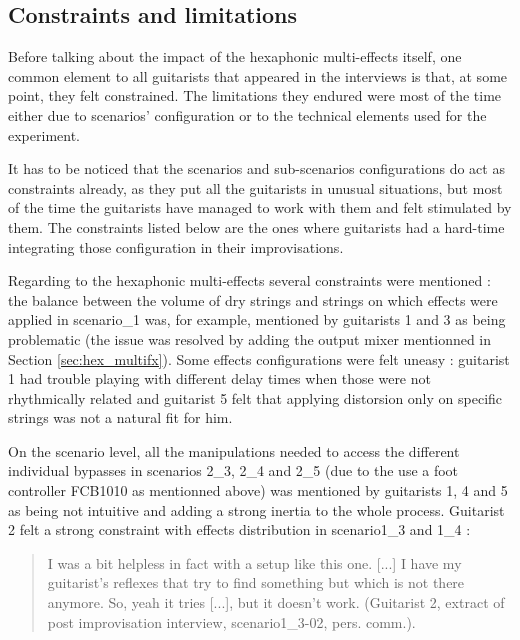 \documentclass{article}
\begin{document}

\subsection{Constraints and limitations}
Before talking about the impact of the hexaphonic multi-effects itself, one common element to all guitarists that appeared in the interviews is that, at some point, they felt constrained. The limitations they endured were most of the time either due to scenarios' configuration or to the technical elements used for the experiment.

It has to be noticed that the scenarios and sub-scenarios configurations do act as constraints already, as they put all the guitarists in unusual situations, but most of the time the guitarists have managed to work with them and felt stimulated by them. The constraints listed below are the ones where guitarists had a hard-time integrating those configuration in their improvisations.

Regarding to the hexaphonic multi-effects several constraints were mentioned : the balance between the volume of dry strings and strings on which effects were applied in scenario\_1 was, for example, mentioned by guitarists 1 and 3 as being problematic (the issue was resolved by adding the output mixer mentionned in Section \ref{sec:hex_multifx}). Some effects configurations were felt uneasy : guitarist 1 had trouble playing with different delay times when those were not rhythmically related and guitarist 5 felt that applying distorsion only on specific strings was not a natural fit for him. 

On the scenario level, all the manipulations needed to access the different individual bypasses in scenarios 2\_3, 2\_4 and 2\_5 (due to the use a foot controller FCB1010 as mentionned above) was mentioned by guitarists 1, 4 and 5 as being not intuitive and adding a strong inertia to the whole process.
Guitarist 2 felt a strong constraint with effects distribution in scenario1\_3 and 1\_4 :
    \begin{quote}
        I was a bit helpless in fact with a setup like this one. [...] I have my guitarist's reflexes that try to find something but which is not there anymore. So, yeah it tries [...], but it doesn't work. (Guitarist 2, extract of post improvisation interview, scenario1\_3-02, pers. comm.).
    \end{quote}
\end{document}
